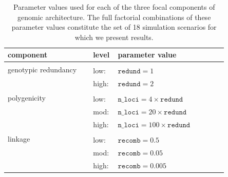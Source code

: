 \documentclass[9pt,twocolumn,twoside,lineno]{pnas-new}
\begin{document}
\begin{table}
\begin{tabular}{b{0.35\linewidth}b{0.05\linewidth}b{0.45\linewidth}}
\hline
\textbf{component} & \textbf{level} & \textbf{parameter value} \\
\hline
\multirow{2}{10em}{genotypic redundancy} \\
& low: & $\texttt{redund}=1$ \\
& high: & $\texttt{redund}=2$ \\
\hline
\multirow{2}{10em}{polygenicity} \\
& low: & $\texttt{n\_loci}=4\times \texttt{redund}$ \\ 
& mod: & $\texttt{n\_loci}=20\times \texttt{redund}$ \\
& high: & $\texttt{n\_loci}=100\times \texttt{redund}$ \\
\hline
\multirow{2}{10em}{linkage} \\
& low: & $\texttt{recomb}=0.5$ \\
& mod: & $\texttt{recomb}=0.05$ \\
& high: & $\texttt{recomb}=0.005$ \\
\hline
\end{tabular}
\medskip
\caption{\label{tab:tab_1}Parameter values used for each of the three focal components of genomic architecture. The full factorial combinations of these parameter values constitute the set of 18 simulation scenarios for which we present results.}
\end{table}
\end{document}
